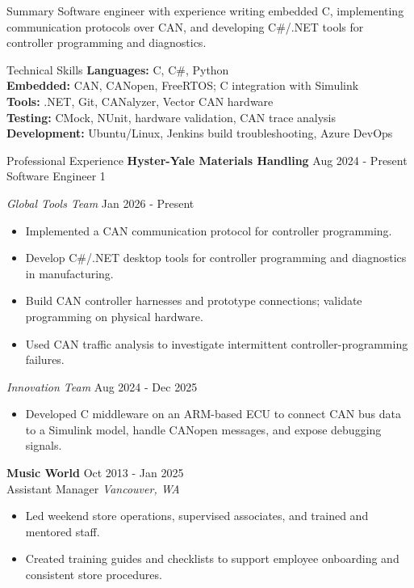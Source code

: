 \begin{rSection}{Summary}
Software engineer with experience writing embedded C, implementing communication protocols over CAN, and developing C\#/.NET tools for controller programming and diagnostics.
\end{rSection}

\begin{rSection}{Technical Skills}
\textbf{Languages:} C, C\#, Python \\
\textbf{Embedded:} CAN, CANopen, FreeRTOS; C integration with Simulink \\
\textbf{Tools:} .NET, Git, CANalyzer, Vector CAN hardware \\
\textbf{Testing:} CMock, NUnit, hardware validation, CAN trace analysis \\
\textbf{Development:} Ubuntu/Linux, Jenkins build troubleshooting, Azure DevOps
\end{rSection}

\begin{rSection}{Professional Experience}
\textbf{Hyster-Yale Materials Handling} \hfill Aug 2024 - Present \\
Software Engineer 1

\textit{Global Tools Team} \hfill Jan 2026 - Present
\begin{itemize}\itemsep -3pt
\item Implemented a CAN communication protocol for controller programming.
\item Develop C\#/.NET desktop tools for controller programming and diagnostics in manufacturing.
\item Build CAN controller harnesses and prototype connections; validate programming on physical hardware.
\item Used CAN traffic analysis to investigate intermittent controller-programming failures.
\end{itemize}

\textit{Innovation Team} \hfill Aug 2024 - Dec 2025
\begin{itemize}\itemsep -3pt
\item Developed C middleware on an ARM-based ECU to connect CAN bus data to a Simulink model, handle CANopen messages, and expose debugging signals.
\end{itemize}

\textbf{Music World} \hfill Oct 2013 - Jan 2025 \\
Assistant Manager \hfill \textit{Vancouver, WA}
\begin{itemize}\itemsep -3pt
\item Led weekend store operations, supervised associates, and trained and mentored staff.
\item Created training guides and checklists to support employee onboarding and consistent store procedures.
\end{itemize}
\end{rSection}

